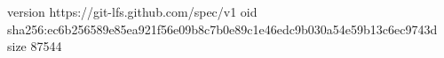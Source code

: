 version https://git-lfs.github.com/spec/v1
oid sha256:ec6b256589e85ea921f56e09b8c7b0e89c1e46edc9b030a54e59b13c6ec9743d
size 87544
